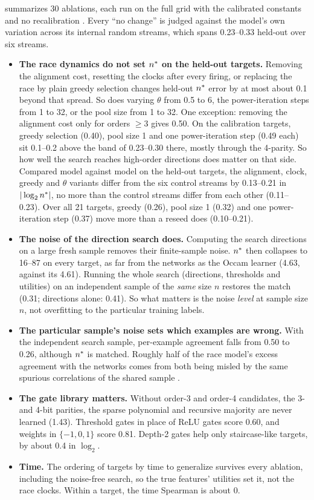  summarizes 30 ablations, each run on the full grid with the calibrated constants and no recalibration . Every ``no change'' is judged against the model's own variation across its internal random streams, which spans 0.23–0.33 held-out over six streams.
\begin{itemize}
\item \textbf{The race dynamics do not set $n^{*}$ on the held-out targets.} Removing the alignment cost, resetting the clocks after every firing, or replacing the race by plain greedy selection changes held-out $n^{*}$ error by at most about 0.1 beyond that spread. So does varying $\theta$ from 0.5 to 6, the power-iteration steps from 1 to 32, or the pool size from 1 to 32. One exception: removing the alignment cost only for orders $\ge3$ gives 0.50. On the calibration targets, greedy selection (0.40), pool size 1 and one power-iteration step (0.49 each) sit 0.1–0.2 above the band of 0.23–0.30 there, mostly through the 4-parity. So how well the search reaches high-order directions does matter on that side. Compared model against model on the held-out targets, the alignment, clock, greedy and $\theta$ variants differ from the six control streams by 0.13–0.21 in $|\log_2n^{*}|$, no more than the control streams differ from each other (0.11–0.23). Over all 21 targets, greedy (0.26), pool size 1 (0.32) and one power-iteration step (0.37) move more than a reseed does (0.10–0.21).
\item \textbf{The noise of the direction search does.} Computing the search directions on a large fresh sample removes their finite-sample noise. $n^{*}$ then collapses to 16–87 on every target, as far from the networks as the Occam learner (4.63, against its 4.61). Running the whole search (directions, thresholds and utilities) on an independent sample of the \emph{same} size $n$ restores the match (0.31; directions alone: 0.41). So what matters is the noise \emph{level} at sample size $n$, not overfitting to the particular training labels.
\item \textbf{The particular sample's noise sets which examples are wrong.} With the independent search sample, per-example agreement falls from 0.50 to 0.26, although $n^{*}$ is matched. Roughly half of the race model's excess agreement with the networks comes from both being misled by the same spurious correlations of the shared sample .
\item \textbf{The gate library matters.} Without order-3 and order-4 candidates, the 3- and 4-bit parities, the sparse polynomial and recursive majority are never learned (1.43). Threshold gates in place of ReLU gates score 0.60, and weights in $\{-1,0,1\}$ score 0.81. Depth-2 gates help only staircase-like targets, by about 0.4 in $\log_2$.
\item \textbf{Time.} The ordering of targets by time to generalize survives every ablation, including the noise-free search, so the true features' utilities set it, not the race clocks. Within a target, the time Spearman is about 0.
\end{itemize}

